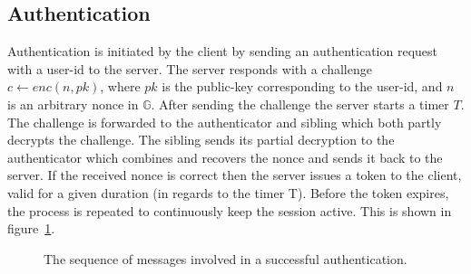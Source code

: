 \subsection{Authentication}
Authentication is initiated by the \gls{client} by sending an authentication request with a user-id to the \gls{server}. The \gls{server} responds with a challenge $c \leftarrow enc(n,pk)$, where $pk$ is the public-key corresponding to the user-id, and $n$ is an arbitrary nonce in $\mathbb{G}$. After sending the challenge the \gls{server} starts a timer $T$. The challenge is forwarded to the \gls{authenticator} and \gls{sibling} which both partly decrypts the challenge. The \gls{sibling} sends its partial decryption to the \gls{authenticator} which combines and recovers the nonce and sends it back to the \gls{server}. If the received nonce is correct then the \gls{server} issues a token to the client, valid for a given duration (in regards to the timer T). Before the token expires, the process is repeated to continuously keep the session active. This is shown in figure~\ref{msc:auth}.

\begin{figure}[bh]
\centering
{}
\caption[Authentication sequence diagram]{The sequence of messages involved in a successful authentication.}
\label{msc:auth}
\end{figure}


